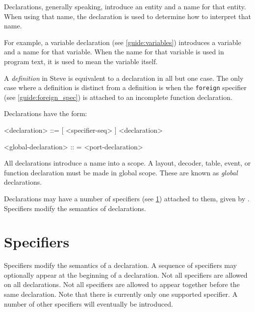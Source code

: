 Declarations, generally speaking, introduce an entity and a name for that entity. When using that name, the declaration is used to determine how to interpret that name. 

For example, a variable declaration (see \ref{guide:variables}) introduces a variable and a name for that variable. When the name for that variable is used in program text, it is used to mean the variable itself.

A \textit{definition} in Steve is equivalent to a declaration in all but one case. The only case where a definition is distinct from a definition is when the \texttt{foreign} specifier (see \ref{guide:foreign_spec}) is attached to an incomplete function declaration.

Declarations have the form:

\begin{minip}
\begin{grammar}
<declaration> ::=
[ <specifier-seq> ] <declaration>

<global-declaration> :: =
<port-declaration>
\end{grammar}
\end{minip}

All declarations introduce a name into a scope. A layout, decoder, table, event, or function declaration must be made in global scope. These are known as \textit{global} declarations.

Declarations may have a number of specifiers (see \ref{guide:specifications}) attached to them, given by . Specifiers modify the semantics of declarations.

\section{Specifiers} \label{guide:specifications}

Specifiers modify the semantics of a declaration. A sequence of specifiers may optionally appear at the beginning of a declaration. Not all specifiers are allowed on all declarations. Not all specifiers are allowed to appear together before the same declaration. Note that there is currently only one supported specifier. A number of other specifiers will eventually be introduced.

